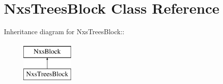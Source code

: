 \hypertarget{classNxsTreesBlock}{
\section{NxsTreesBlock Class Reference}
\label{classNxsTreesBlock}
}
Inheritance diagram for NxsTreesBlock::\begin{figure}[H]
\begin{center}
\leavevmode
\includegraphics[height=2cm]{classNxsTreesBlock}
\end{center}
\end{figure}
